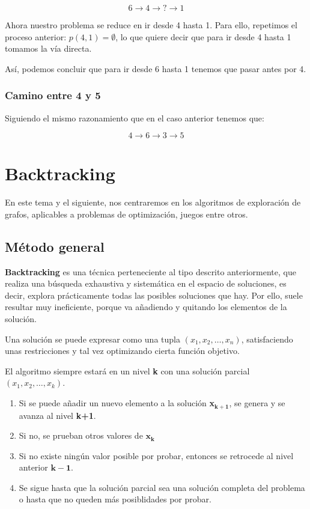 \documentclass[10pt,a4paper,spanish]{report}
\theoremstyle{definition}
\theoremstyle{remark}
\begin{document}
\begin{displaymath}
6 \longrightarrow 4 \longrightarrow ? \longrightarrow 1
\end{displaymath}

Ahora nuestro problema se reduce en ir desde 4 hasta 1. Para ello, repetimos el proceso anterior: $p(4,1) = \emptyset$, lo que quiere decir que para ir desde 4 hasta 1 tomamos la vía directa. 

Así, podemos concluir que para ir desde 6 hasta 1 tenemos que pasar antes por 4.

\subsection{Camino entre 4 y 5}
Siguiendo el mismo razonamiento que en el caso anterior tenemos que:

\begin{displaymath}
4 \longrightarrow 6 \longrightarrow 3 \longrightarrow 5
\end{displaymath}


\chapter{\textcolor{electricgreen}Backtracking}
\label{backtracking}

En este tema y el siguiente, nos centraremos en los algoritmos de exploración de grafos, aplicables a problemas de optimización, juegos entre otros.

\section{\textcolor{electricgreen}Método general}

\textbf{\textcolor{electricgreen}{Backtracking}} es una técnica perteneciente al tipo descrito anteriormente, que realiza una búsqueda exhaustiva y sistemática en el espacio de soluciones, es decir, explora prácticamente todas las posibles soluciones que hay. Por ello, suele resultar muy ineficiente, porque va añadiendo y quitando los elementos de la solución.

Una solución se puede expresar como una tupla $(x_1, x_2, \ldots, x_n)$, satisfaciendo unas restricciones y tal vez optimizando cierta función objetivo.

El algoritmo siempre estará en un nivel \textbf{\textcolor{electricgreen}k} con una solución parcial $(x_1, x_2, \ldots, x_k)$.

\begin{enumerate}[---]
    \item Si se puede añadir un nuevo elemento a la solución \textbf{x$\mathbf{_{k+1}}$}, se genera y se avanza al nivel \textbf{k+1}.
    \item Si no, se prueban otros valores de $\mathbf{x_k}$
    \item Si no existe ningún valor posible por probar, entonces se retrocede al nivel anterior $\mathbf{k-1}$.
    \item Se sigue hasta que la solución parcial sea una solución completa del problema o hasta que no queden más posiblidades por probar.
\end{enumerate}
\end{document}
